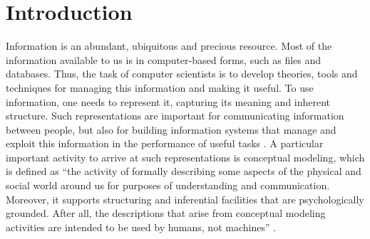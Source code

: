 \documentclass[
  10pt,				%
  oneside,
  a4paper,			%
  brazilian,
  english
]{abntex2}
\begin{document}
\tableofcontents*
\cleardoublepage

\textual

%  



\chapter[Introduction]{Introduction}

Information is an abundant, ubiquitous and precious resource. Most of the information available to us is in computer-based forms, such as files and databases. Thus, the task of computer scientists is to develop theories, tools and techniques for managing this information and making it useful. To use information, one needs to represent it, capturing its meaning and inherent structure. Such representations are important for communicating information between people, but also for building information systems that manage and exploit this information in the performance of useful tasks \cite{mylopoulos98}.
%
A particular important activity to arrive at such representations is conceptual modeling, which is defined as “the activity of formally describing some aspects of the physical and social world around us for purposes of understanding and communication. Moreover, it supports structuring and inferential facilities that are psychologically grounded. After all, the descriptions that arise from conceptual modeling activities are intended to be used by humans, not machines” \cite{mylopoulos92}.
\end{document}

